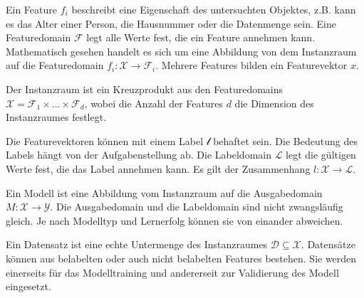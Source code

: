 \begin{term}
	Ein Feature $f_i$ beschreibt eine Eigenschaft des untersuchten Objektes, z.B. kann es das Alter einer Person, die Hausnummer oder die Datenmenge sein. 
	Eine Featuredomain $\mathscr{F}$ legt alle Werte fest, die ein Feature annehmen kann. 
Mathematisch gesehen handelt es sich um eine Abbildung von dem Instanzraum auf die Featuredomain $f_i : \mathscr{X} \rightarrow \mathscr{F}_i$. 
Mehrere Features bilden ein Featurevektor $x$. 
\end{term}

\begin{term}[Instanzraum]
Der Instanzraum ist ein Kreuzprodukt aus den Featuredomains $\mathscr{X} = \mathscr{F}_1 \times \dots \times \mathscr{F}_d$, wobei die Anzahl der Features $d$ die Dimension des Instanzraumes festlegt.
\end{term}

\begin{term}
	Die Featurevektoren können mit einem Label $\mathscr{l}$ behaftet sein. 
	Die Bedeutung des Labels hängt von der Aufgabenstellung ab.
	Die Labeldomain $\mathscr{L}$ legt die gültigen Werte fest, die das Label annehmen kann.
	Es gilt der Zusammenhang $l : \mathscr{X} \rightarrow \mathscr{L}$.
\end{term}



\begin{term}
	Ein Modell ist eine Abbildung vom Instanzraum auf die Ausgabedomain $M:\mathscr{X} \rightarrow \mathscr{Y}$.
	Die Ausgabedomain und die Labeldomain sind nicht zwangsläufig gleich.
	Je nach Modelltyp und Lernerfolg können sie von einander abweichen.
\end{term}

\begin{term}[Datensatz]
	Ein Datensatz ist eine echte Untermenge des Instanzraumes $\mathscr{D} \subseteq \mathscr{X}$. 
	Datensätze können aus belabelten oder auch nicht belabelten Features bestehen.
	Sie werden einerseits für das Modelltraining und andererseit zur Validierung des Modell eingesetzt.
\end{term}


